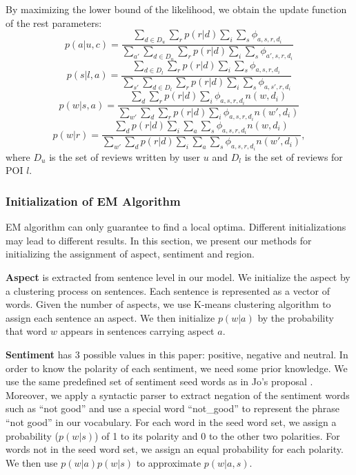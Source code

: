 By maximizing the lower bound of the likelihood, we
obtain the update function of the rest parameters:
\begin{equation}
p(a|u,c)=\frac{\sum_{d\in D_u}{\sum_{r}{p(r|d)\sum_{i}{\sum_{s}{\phi_{a,s,r,d_i}}}}}}{\sum_{a'}{\sum_{d\in D_u}{\sum_{r}{p(r|d)\sum_{i}{\sum_{s}{\phi_{a',s,r,d_i}}}}}}}
\label{eq:pacu}
\end{equation}
\begin{equation}
p(s|l,a)=\frac{\sum_{d\in D_l}{\sum_{r}{p(r|d)\sum_{i}{\sum_{s}{\phi_{a,s,r,d_i}}}}}}{\sum_{s'}{\sum_{d\in D_l}{\sum_{r}{p(r|d)\sum_{i}{\sum_{s}{\phi_{a,s',r,d_i}}}}}}}
\label{eq:psal}
\end{equation}
\begin{equation}
p(w|s,a)=\frac{\sum_{d}{\sum_{r}{p(r|d)\sum_{i}{\phi_{a,s,r,d_i}n(w,d_i)}}}}{\sum_{w'}{\sum_{d}{\sum_{r}{p(r|d)\sum_{i}{\phi_{a,s,r,d_i}n(w',d_i)}}}}}
\label{eq:pwsa}
\end{equation}
\begin{equation}
p(w|r)=\frac{\sum_{d}{p(r|d)\sum_{i}{\sum_{a}{\sum_{s}{\phi_{a,s,r,d_i}n(w,d_i)}}}}}{\sum_{w'}{\sum_{d}{p(r|d)\sum_{i}{\sum_{a}{\sum_{s}{\phi_{a,s,r,d_i}n(w',d_i)}}}}}},
\label{eq:pwr}
\end{equation}
where $D_u$ is the set of reviews written by user $u$ and $D_l$
is the set of reviews for POI $l$.

\subsubsection{Initialization of EM Algorithm}
EM algorithm can only guarantee to find a local optima.
Different initializations may lead to different results.
In this section, we present our methods for initializing the assignment of
aspect, sentiment and region.

\textbf{Aspect} is extracted from sentence level in our model.
We initialize the aspect by a clustering process on
sentences. Each sentence is represented as a vector of words.
Given the number of aspects, we use K-means clustering
algorithm to assign each sentence an aspect.
We then initialize $p(w|a)$ by the probability that word
$w$ appears in sentences carrying aspect $a$.

\textbf{Sentiment} has 3 possible values in this paper:
positive, negative and neutral.
In order to know the polarity of each sentiment, we need some prior
knowledge. We use the same predefined set of sentiment seed words
as in Jo's proposal \cite{JoASUM:2011}. Moreover, we apply a syntactic parser to
extract negation of the sentiment words such as ``not good'' and
use a special word ``not\_good'' to represent the phrase ``not good''
in our vocabulary. For each word in the seed word set, we assign
a probability ($p(w|s)$) of 1 to its polarity and 0 to the other
two polarities. For words not in the seed word set, we assign an
equal probability for each polarity. We then use $p(w|a)p(w|s)$
to approximate $p(w|a,s)$.

